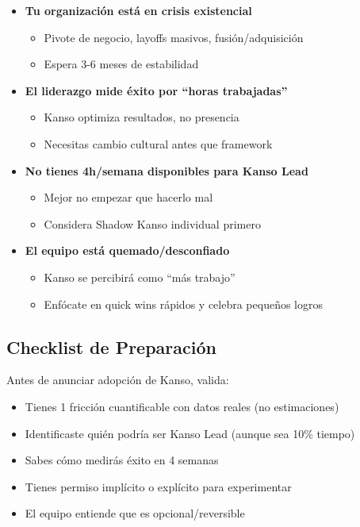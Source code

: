 \begin{itemize}
    \item[$\times$] \textbf{Tu organización está en crisis existencial}
    \begin{itemize}
        \item Pivote de negocio, layoffs masivos, fusión/adquisición
        \item Espera 3-6 meses de estabilidad
    \end{itemize}
    
    \item[$\times$] \textbf{El liderazgo mide éxito por ``horas trabajadas''}
    \begin{itemize}
        \item Kanso optimiza resultados, no presencia
        \item Necesitas cambio cultural antes que framework
    \end{itemize}
    
    \item[$\times$] \textbf{No tienes 4h/semana disponibles para Kanso Lead}
    \begin{itemize}
        \item Mejor no empezar que hacerlo mal
        \item Considera Shadow Kanso individual primero
    \end{itemize}
    
    \item[$\times$] \textbf{El equipo está quemado/desconfiado}
    \begin{itemize}
        \item Kanso se percibirá como ``más trabajo''
        \item Enfócate en quick wins rápidos y celebra pequeños logros
    \end{itemize}
\end{itemize}

\subsection*{Checklist de Preparación}

Antes de anunciar adopción de Kanso, valida:

\begin{itemize}
    \item Tienes 1 fricción cuantificable con datos reales (no estimaciones)
    \item Identificaste quién podría ser Kanso Lead (aunque sea 10\% tiempo)
    \item Sabes cómo medirás éxito en 4 semanas
    \item Tienes permiso implícito o explícito para experimentar
    \item El equipo entiende que es opcional/reversible
\end{itemize}

